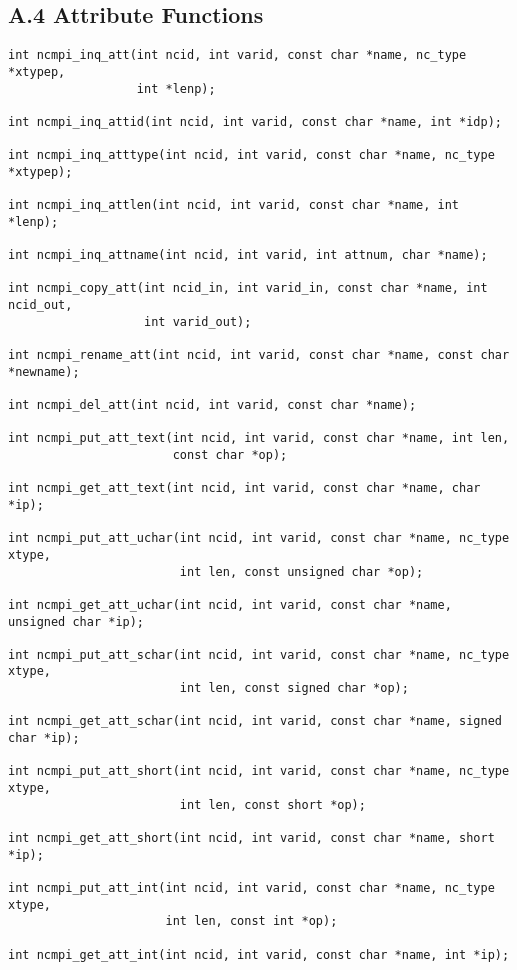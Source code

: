 \documentclass[10pt]{article}
\begin{document}
\subsection*{A.4  Attribute Functions}

\begin{verbatim}
int ncmpi_inq_att(int ncid, int varid, const char *name, nc_type *xtypep,
                  int *lenp);

int ncmpi_inq_attid(int ncid, int varid, const char *name, int *idp);

int ncmpi_inq_atttype(int ncid, int varid, const char *name, nc_type *xtypep);

int ncmpi_inq_attlen(int ncid, int varid, const char *name, int *lenp);

int ncmpi_inq_attname(int ncid, int varid, int attnum, char *name);

int ncmpi_copy_att(int ncid_in, int varid_in, const char *name, int ncid_out,
                   int varid_out);

int ncmpi_rename_att(int ncid, int varid, const char *name, const char *newname);

int ncmpi_del_att(int ncid, int varid, const char *name);

int ncmpi_put_att_text(int ncid, int varid, const char *name, int len,
                       const char *op);

int ncmpi_get_att_text(int ncid, int varid, const char *name, char *ip);

int ncmpi_put_att_uchar(int ncid, int varid, const char *name, nc_type xtype,
                        int len, const unsigned char *op);

int ncmpi_get_att_uchar(int ncid, int varid, const char *name, unsigned char *ip);

int ncmpi_put_att_schar(int ncid, int varid, const char *name, nc_type xtype, 
                        int len, const signed char *op);

int ncmpi_get_att_schar(int ncid, int varid, const char *name, signed char *ip);

int ncmpi_put_att_short(int ncid, int varid, const char *name, nc_type xtype,
                        int len, const short *op);

int ncmpi_get_att_short(int ncid, int varid, const char *name, short *ip);

int ncmpi_put_att_int(int ncid, int varid, const char *name, nc_type xtype, 
                      int len, const int *op);

int ncmpi_get_att_int(int ncid, int varid, const char *name, int *ip);


\end{verbatim}
\end{document}
